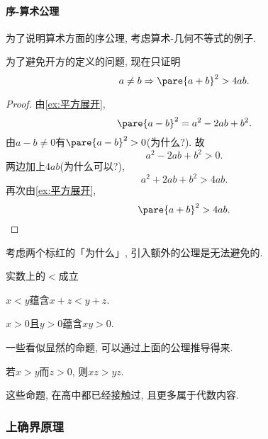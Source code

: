 \documentclass[hidelinks]{ctexart}
\begin{document}
\paragraph{序-算术公理}
为了说明算术方面的序公理, 考虑算术-几何不等式的例子.
\begin{sample}
    \begin{ex}
        为了避免开方的定义的问题, 现在只证明
        \[ a\neq b \Rightarrow \pare{a+b}^2 > 4ab. \]
    \end{ex}
    \begin{proof}
        由\cref{ex:平方展开},
        \[ \pare{a-b}^2 = a^2 - 2ab + b^2. \]
        由$a-b\neq 0$有$\pare{a-b}^2>0$({\color{red}为什么?}). 故
        \[ a^2 - 2ab + b^2 > 0. \]
        两边加上$4ab$({\color{red}为什么可以?}),
        \[ a^2 + 2ab + b^2 > 4ab. \]
        再次由\cref{ex:平方展开},
        \[ \pare{a+b}^2 > 4ab. \qedhere \]
    \end{proof}
\end{sample}
考虑两个标红的「为什么」, 引入额外的公理是无法避免的.
\begin{finale}
    \begin{axiom}[序-算术公理]
        \label{ax:序算术公理}
        实数上的$<$成立
        \begin{cenum}
            \item $x<y$蕴含$x+z<y+z$.
            \item $x>0$且$y>0$蕴含$xy>0$.
        \end{cenum}
    \end{axiom}
\end{finale}
一些看似显然的命题, 可以通过上面的公理推导得来.
\begin{ex}
    若$x>y$而$z>0$, 则$xz>yz$.
\end{ex}
这些命题, 在高中都已经接触过, 且更多属于代数内容.


\subsubsection{上确界原理} %
\label{ssub:上确界原理}
\end{document}
